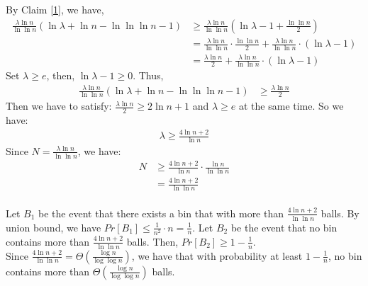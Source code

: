 By Claim \ref{1},
we have,
\begin{align}
    \nonumber \frac{\lambda \ln n}{\ln \ln n}(\ln \lambda +\ln n -\ln \ln \ln n -1) &\ge \frac{\lambda \ln n}{\ln \ln n}(\ln \lambda -1 +\frac{\ln \ln n}{2})\\
    \nonumber &=\frac{\lambda \ln n}{\ln \ln n}\cdot \frac{\ln\ln n}{2}+\frac{\lambda \ln n}{\ln \ln n}\cdot(\ln\lambda-1)\\
    \nonumber &=\frac{\lambda \ln n}{2} +\frac{\lambda \ln n}{\ln \ln n}\cdot(\ln\lambda-1)
\end{align}
Set $\lambda \ge e$, then, $\ln\lambda-1 \ge 0$. Thus,
\begin{align}
    \nonumber \frac{\lambda \ln n}{\ln \ln n}(\ln \lambda +\ln n -\ln \ln \ln n -1) &\ge \frac{\lambda \ln n}{2}
\end{align}
Then we have to satisfy:
$\frac{\lambda \ln n}{2} \ge 2\ln n +1$ and $\lambda \ge e$ at the same time. So we have:
\begin{align}
    \nonumber \lambda \ge \frac{4\ln n +2}{\ln n}
\end{align}
Since $N=\frac{\lambda \ln n}{\ln \ln n}$, we have:
\begin{align}
    \nonumber N&\ge \frac{4\ln n +2}{\ln n}\cdot \frac{\ln n}{\ln \ln n}\\
    \nonumber &= \frac{4\ln n +2}{\ln \ln n}
\end{align}
\noindent{}\\
Let $B_1$ be the event that there exists a bin that with more than $\frac{4\ln n +2}{\ln \ln n}$ balls.
By union bound, we have $Pr[B_1]\le\frac{1}{n^2}\cdot n=\frac{1}{n}$.
Let $B_2$ be the event that no bin contains more than $\frac{4\ln n +2}{\ln \ln n}$ balls.
Then, $Pr[B_2]\ge 1-\frac{1}{n}$.\\
Since $\frac{4\ln n +2}{\ln \ln n}=\Theta(\frac{\log n}{\log\log n})$, we have that with probability at least $1-\frac{1}{n}$, no bin contains more than $\Theta(\frac{\log n}{\log\log n})$ balls.
